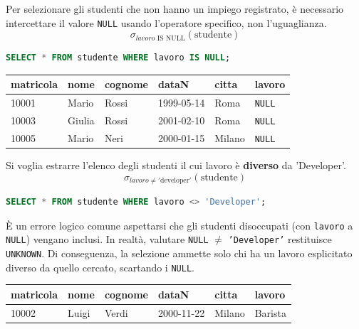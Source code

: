\begin{example}
    Per selezionare gli studenti che non hanno un impiego registrato, è necessario intercettare il valore \texttt{NULL} usando l'operatore specifico, non l'uguaglianza.
    $$ \sigma_{lavoro \text{ IS NULL}}(\text{studente}) $$
    \begin{lstlisting}[language=SQL]
    SELECT * FROM studente WHERE lavoro IS NULL;
    \end{lstlisting}
    
    \begin{table}[H]
        \centering
        \renewcommand{\arraystretch}{1.2}
        \begin{tabular}{llllll}
            \toprule
            \textbf{matricola} & \textbf{nome} & \textbf{cognome} & \textbf{dataN} & \textbf{citta} & \textbf{lavoro} \\
            \midrule
            10001 & Mario  & Rossi   & 1999-05-14 & Roma   & \texttt{NULL} \\
            10003 & Giulia & Rossi   & 2001-02-10 & Roma   & \texttt{NULL} \\
            10005 & Mario  & Neri    & 2000-01-15 & Milano & \texttt{NULL} \\
            \bottomrule
        \end{tabular}
    \end{table}
\end{example}

\begin{example}
    Si voglia estrarre l'elenco degli studenti il cui lavoro è \textbf{diverso} da 'Developer'. 
    $$ \sigma_{lavoro \neq '\text{developer}'}(\text{studente}) $$
    \begin{lstlisting}[language=SQL]
    SELECT * FROM studente WHERE lavoro <> 'Developer';
    \end{lstlisting}
    È un errore logico comune aspettarsi che gli studenti disoccupati (con \texttt{lavoro} a \texttt{NULL}) vengano inclusi. In realtà, valutare \texttt{NULL} $\neq$ \texttt{'Developer'} restituisce \texttt{UNKNOWN}. Di conseguenza, la selezione ammette solo chi ha un lavoro esplicitato diverso da quello cercato, scartando i \texttt{NULL}.
    
    \begin{table}[H]
        \centering
        \renewcommand{\arraystretch}{1.2}
        \begin{tabular}{llllll}
            \toprule
            \textbf{matricola} & \textbf{nome} & \textbf{cognome} & \textbf{dataN} & \textbf{citta} & \textbf{lavoro} \\
            \midrule
            10002 & Luigi  & Verdi   & 2000-11-22 & Milano & Barista \\
            \bottomrule
        \end{tabular}
    \end{table}
\end{example}



